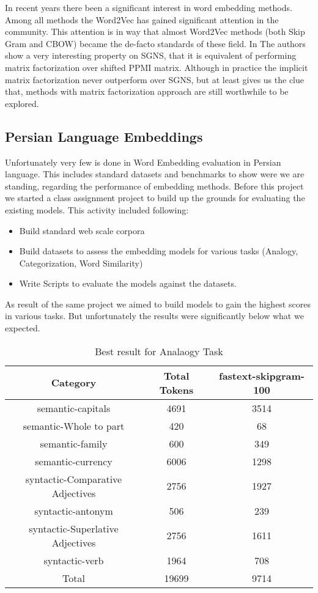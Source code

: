 In recent years there been  a significant interest in word embedding methods. Among all methods the Word2Vec \cite{NIPS2013_5021} has gained significant attention in the community. This attention is in way that almost Word2Vec methods (both Skip Gram and CBOW) became the de-facto standards of these field. In \cite{NIPS2014_5477} The authors show a very interesting property on SGNS, that it is equivalent of performing matrix factorization over shifted PPMI matrix.  Although in practice the implicit matrix factorization never outperform over SGNS, but at least gives us the clue that, methods with matrix factorization approach are still worthwhile to be explored. 

\subsection{Persian Language Embeddings}
Unfortunately very few is done in Word Embedding evaluation in Persian language.  This includes standard datasets and benchmarks to show  were we are standing, regarding the performance of embedding methods. 
Before this project we started a class assignment project to build up the grounds for  evaluating the existing models.  This activity included following: 
\begin{itemize}
    \item Build standard web scale corpora 
    \item Build datasets to assess the embedding models for various tasks (Analogy, Categorization, Word Similarity)
    \item Write Scripts to evaluate the models against the datasets. 
\end{itemize} 

As result of the same project we aimed to build models to gain the  highest scores in various tasks. But unfortunately the results were  significantly below what we expected.  

\begin{table}
    \centering
    \caption{Best result for Analaogy Task}
    \begin{tabular}{|c|c|c|}
        \hline
        Category	& Total Tokens	 & fastext-skipgram-100 \\
        \hline
        semantic-capitals	& 4691	& 3514 \\
        semantic-Whole to part &	420 & 	68 \\
        semantic-family	& 600	& 349 \\
        semantic-currency	& 6006&	1298 \\
        syntactic-Comparative Adjectives	&2756	&1927 \\
        syntactic-antonym	&506	&239 \\
        syntactic-Superlative Adjectives&	2756	&1611 \\
        syntactic-verb	&1964 &	708  \\ 
        \hline
        Total & 19699 & 9714 \\
        \hline
    \end{tabular}
\end{table}

